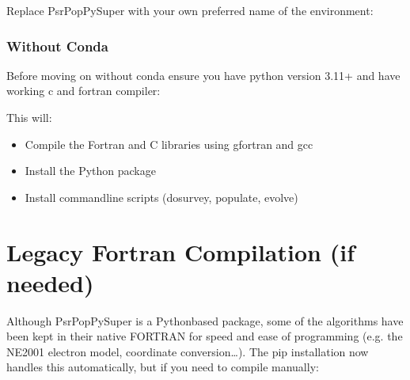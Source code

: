 \documentclass[letterpaper,10pt,english]{sphinxmanual}
\begin{document}
\sphinxAtStartPar
Replace PsrPopPySuper with your own preferred name of the environment:

\begin{sphinxVerbatim}[commandchars=\\\{\}]
   
\end{sphinxVerbatim}


\subsubsection{Without Conda}
\label{\detokenize{installation:without-conda}}
\sphinxAtStartPar
Before moving on without conda ensure you have python version 3.11+ and have working c and fortran compiler:

\begin{sphinxVerbatim}[commandchars=\\\{\}]
 
   
   
\end{sphinxVerbatim}

\sphinxAtStartPar
{\color{red}\bfseries{}\textasciigrave{}}

\sphinxAtStartPar
This will:
\begin{itemize}
\item {} 
\sphinxAtStartPar
Compile the Fortran and C libraries using gfortran and gcc

\item {} 
\sphinxAtStartPar
Install the Python package

\item {} 
\sphinxAtStartPar
Install command\sphinxhyphen{}line scripts (dosurvey, populate, evolve)

\end{itemize}


\section{Legacy Fortran Compilation (if needed)}
\label{\detokenize{installation:legacy-fortran-compilation-if-needed}}\label{\detokenize{installation:legacy-compiling-fortran}}
\sphinxAtStartPar
Although PsrPopPySuper is a Python\sphinxhyphen{}based package, some of the algorithms
have been kept in their native FORTRAN for speed and ease of
programming (e.g. the NE2001 electron model, coordinate conversion…).
The pip installation now handles this automatically, but if you need
to compile manually:
\end{document}
